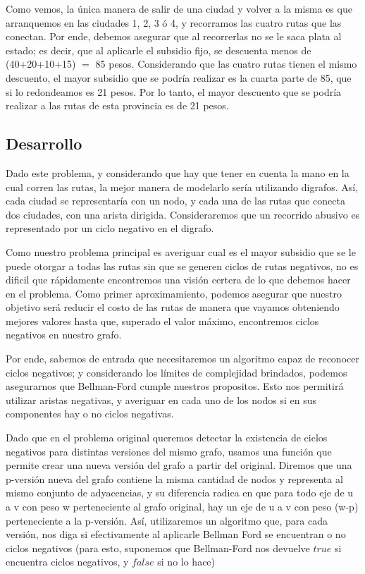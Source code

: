 Como vemos, la única manera de salir de una ciudad y volver a la misma es que arranquemos en las ciudades 1, 2, 3 ó 4, y recorramos las cuatro rutas que las conectan. Por ende, debemos asegurar que al recorrerlas no se le saca plata al estado; es decir, que al aplicarle el subsidio fijo, se descuenta menos de (40+20+10+15) $=$ 85 pesos. Considerando que las cuatro rutas tienen el mismo descuento, el mayor subsidio que se podría realizar es la cuarta parte de 85, que si lo redondeamos es 21 pesos. Por lo tanto, el mayor descuento que se podría realizar a las rutas de esta provincia es de 21 pesos.
\\
\par
\subsection{Desarrollo}
Dado este problema, y considerando que hay que tener en cuenta la mano en la cual corren las rutas, la mejor manera de modelarlo sería utilizando digrafos. Así, cada ciudad se representaría con un nodo, y cada una de las rutas que conecta dos ciudades, con una arista dirigida. Consideraremos que un recorrido abusivo es representado por un ciclo negativo en el digrafo.
\\
\par
Como nuestro problema principal es averiguar cual es el mayor subsidio que se le puede otorgar a todas las rutas sin que se generen ciclos de rutas negativos, no es dificil que rápidamente encontremos una visión certera de lo que debemos hacer en el problema. Como primer aproximamiento, podemos asegurar que nuestro objetivo será reducir el costo de las rutas de manera que vayamos obteniendo mejores valores hasta que, superado el valor máximo, encontremos ciclos negativos en nuestro grafo.
\\
\par
Por ende, sabemos de entrada que necesitaremos un algoritmo capaz de reconocer ciclos negativos; y considerando los límites de complejidad brindados, podemos asegurarnos que Bellman-Ford cumple nuestros propositos. Esto nos permitirá utilizar aristas negativas, y averiguar en cada uno de los nodos si en sus componentes hay o no ciclos negativas.
\\
\par
Dado que en el problema original queremos detectar la existencia de ciclos negativos para distintas versiones del mismo grafo, usamos una función que permite crear una nueva versión del grafo a partir del original. Diremos que una p-versión nueva del grafo contiene la misma cantidad de nodos y representa al mismo conjunto de adyacencias, y su diferencia radica en que para todo eje de u a v con peso w perteneciente al grafo original, hay un eje de u a v con peso (w-p) perteneciente a la p-versión. Así, utilizaremos un algoritmo que, para cada versión, nos diga si efectivamente al aplicarle Bellman Ford se encuentran o no ciclos negativos (para esto, suponemos que Bellman-Ford nos devuelve $true$ si encuentra ciclos negativos, y $false$ si no lo hace)
